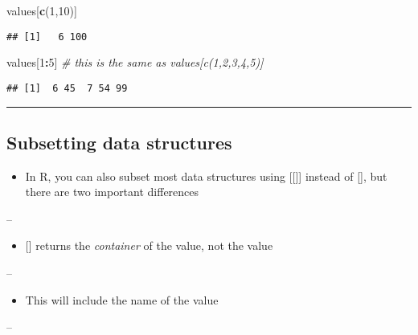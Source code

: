 \documentclass[]{article}
\newenvironment{Shaded}{\begin{snugshade}}{\end{snugshade}}
\newcommand{\CommentTok}[1]{\textcolor[rgb]{0.56,0.35,0.01}{\textit{#1}}}
\newcommand{\DecValTok}[1]{\textcolor[rgb]{0.00,0.00,0.81}{#1}}
\newcommand{\KeywordTok}[1]{\textcolor[rgb]{0.13,0.29,0.53}{\textbf{#1}}}
\newcommand{\NormalTok}[1]{#1}
\newcommand{\OperatorTok}[1]{\textcolor[rgb]{0.81,0.36,0.00}{\textbf{#1}}}
\providecommand{\tightlist}{%
  \setlength{\itemsep}{0pt}\setlength{\parskip}{0pt}}
\begin{document}
\begin{Shaded}
\begin{Highlighting}[]
\NormalTok{values[}\KeywordTok{c}\NormalTok{(}\DecValTok{1}\NormalTok{,}\DecValTok{10}\NormalTok{)]}
\end{Highlighting}
\end{Shaded}

\begin{verbatim}
## [1]   6 100
\end{verbatim}

\begin{Shaded}
\begin{Highlighting}[]
\NormalTok{values[}\DecValTok{1}\OperatorTok{:}\DecValTok{5}\NormalTok{] }\CommentTok{# this is the same as values[c(1,2,3,4,5)]}
\end{Highlighting}
\end{Shaded}

\begin{verbatim}
## [1]  6 45  7 54 99
\end{verbatim}

\begin{center}\rule{0.5\linewidth}{\linethickness}\end{center}

\hypertarget{subsetting-data-structures-2}{%
\subsection{Subsetting data
structures}\label{subsetting-data-structures-2}}

\begin{itemize}
\tightlist
\item
  In R, you can also subset most data structures using {[}{[}{]}{]}
  instead of {[}{]}, but there are two important differences
\end{itemize}

--

\begin{itemize}
\tightlist
\item
  {[}{]} returns the \emph{container} of the value, not the value
\end{itemize}

--

\begin{itemize}
\tightlist
\item
  This will include the name of the value
\end{itemize}

--
\end{document}
